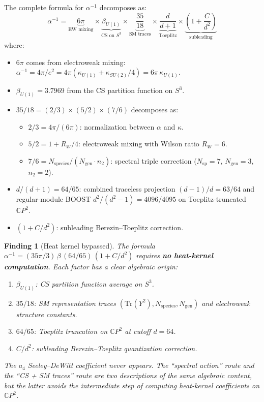 \documentclass[12pt,a4paper]{article}
\newtheorem{finding}{Finding}
\theoremstyle{definition}
\theoremstyle{remark}
\begin{document}
The complete formula for $\alpha^{-1}$ decomposes as:
\begin{equation}
\boxed{
\alpha^{-1} = \underbrace{6\pi}_{\text{EW mixing}}
\times \underbrace{\beta_{U(1)}}_{\text{CS on }S^3}
\times \underbrace{\frac{35}{18}}_{\text{SM traces}}
\times \underbrace{\frac{d}{d+1}}_{\text{Toeplitz}}
\times \underbrace{\left(1 + \frac{C}{d^2}\right)}_{\text{subleading}}
}
\end{equation}
where:
\begin{itemize}
\item $6\pi$ comes from electroweak mixing:
  $\alpha^{-1} = 4\pi/e^2 = 4\pi(\kappa_{U(1)} + \kappa_{SU(2)}/4)
  = 6\pi\,\kappa_{U(1)}$.
\item $\beta_{U(1)} = 3.7969$ from the CS partition function on $S^3$.
\item $35/18 = (2/3)\times(5/2)\times(7/6)$ decomposes as:
  \begin{itemize}
  \item $2/3 = 4\pi/(6\pi)$: normalization between $\alpha$ and $\kappa$.
  \item $5/2 = 1 + R_W/4$: electroweak mixing with Wilson ratio $R_W = 6$.
  \item $7/6 = N_{\mathrm{species}}/(N_{\mathrm{gen}} \cdot n_2)$:
    spectral triple correction ($N_{\mathrm{sp}} = 7$, $N_{\mathrm{gen}} = 3$,
    $n_2 = 2$).
  \end{itemize}
\item $d/(d+1) = 64/65$: combined traceless projection $(d{-}1)/d = 63/64$
  and regular-module BOOST $d^2/(d^2{-}1) = 4096/4095$ on Toeplitz-truncated
  $\mathbb{C}P^2$.
\item $(1 + C/d^2)$: subleading Berezin--Toeplitz correction.
\end{itemize}

\begin{finding}[Heat kernel bypassed]
\label{find:bypass}
The formula $\alpha^{-1} = (35\pi/3)\,\beta\,(64/65)\,(1 + C/d^2)$
requires \textbf{no heat-kernel computation}.  Each factor has a clear
algebraic origin:
\begin{enumerate}
\item $\beta_{U(1)}$: CS partition function average on $S^3$.
\item $35/18$: SM representation traces
  $(\mathrm{Tr}(Y^2), N_{\mathrm{species}}, N_{\mathrm{gen}})$
  and electroweak structure constants.
\item $64/65$: Toeplitz truncation on $\mathbb{C}P^2$ at cutoff $d = 64$.
\item $C/d^2$: subleading Berezin--Toeplitz quantization correction.
\end{enumerate}
The $a_4$ Seeley--DeWitt coefficient never appears.  The ``spectral action''
route and the ``CS + SM traces'' route are two \emph{descriptions of the
same algebraic content}, but the latter avoids the intermediate step of
computing heat-kernel coefficients on $\mathbb{C}P^2$.
\end{finding}
\end{document}
